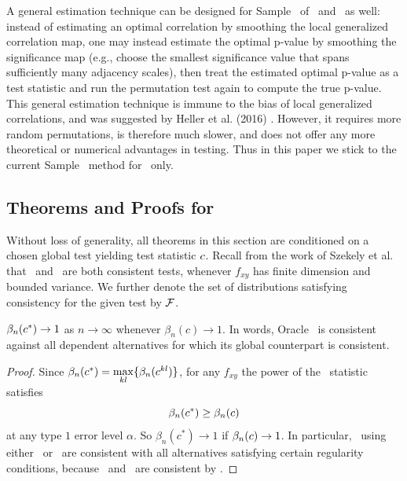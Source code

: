 \documentclass[11pt]{extarticle}
\begin{document}
A general estimation technique can be designed for Sample \Mgc~of \Dcorr~and \Mantel~as well: instead of estimating an optimal correlation by smoothing the local generalized correlation map, one may instead estimate the optimal p-value by smoothing the significance map (e.g., choose the smallest significance value that spans sufficiently many adjacency scales), then treat the estimated optimal p-value as a test statistic and run the permutation test again to compute the true p-value. This general estimation technique is immune to the bias of local generalized correlations, and was suggested by Heller et al. (2016) \cite{heller2016consistent}. However, it requires more random permutations, is therefore much slower, and does not offer any more theoretical or numerical advantages in testing. Thus in this paper we stick to the current Sample \Mgc~method for \Mcorr~only.

\subsection{Theorems and Proofs for \Mgc}
\label{appen:theory}

Without loss of generality, all theorems in this section are conditioned on a chosen global test yielding test statistic $c$.
Recall from the work of Szekely et al. that \Dcorr~and \Mcorr~are both consistent tests, whenever $f_{xy}$ has finite dimension and bounded variance. We further denote the set of distributions satisfying consistency for the given test by $\mathcal{F}$.
\begin{thm}
\label{t:thm1}
$\beta_n(c^*) \rightarrow 1$ as $n \to \infty$ whenever $\beta_n(c) \rightarrow 1$.
In words, Oracle \Mgc~is consistent against all dependent alternatives for which its global counterpart is consistent.
\end{thm}
\begin{proof}
Since $\beta_n(c^*)=\underset{kl}{\max}\{\beta_n(c^{kl})\}$, for any $f_{xy}$ the power of the \Mgc~statistic satisfies
\begin{equation*}
\beta_n(c^*) \geq \beta_n(c)
\end{equation*}
at any type $1$ error level $\alpha$. So $\beta_n(c^*) \rightarrow 1$ if $\beta_n(c) \rightarrow 1$.
In particular, \Mgc~using either \Dcorr~or \Mcorr~are consistent with all alternatives satisfying certain regularity conditions, because \Dcorr~and \Mcorr~are consistent by \cite{SzekelyRizzoBakirov2007, SzekelyRizzo2013a}.
\end{proof}
\end{document}
